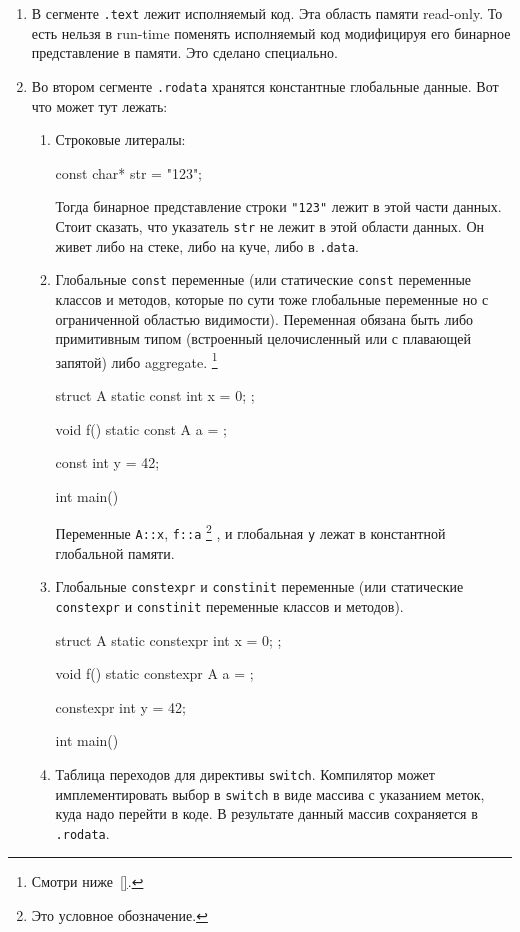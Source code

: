 \documentclass{article}
\begin{document}
\begin{enumerate}
\item В сегменте \verb".text" лежит исполняемый код.
Эта область памяти read-only.
То есть нельзя в run-time поменять исполняемый код модифицируя его бинарное представление в памяти.
Это сделано специально.

\item Во втором сегменте \verb".rodata" хранятся константные глобальные данные.
Вот что может тут лежать:
\begin{enumerate}
\item Строковые литералы:
\begin{cppcode}[numbers = none]
const char* str = "123";
\end{cppcode}
Тогда бинарное представление строки \verb$"123"$ лежит в этой части данных.
Стоит сказать, что указатель \verb"str" не лежит в этой области данных.
Он живет либо на стеке, либо на куче, либо в \verb".data".

\item Глобальные \verb"const" переменные (или статические \verb"const" переменные классов и методов, которые по сути тоже глобальные переменные но с ограниченной областью видимости).
Переменная обязана быть либо примитивным типом (встроенный целочисленный или с плавающей запятой) либо aggregate.%
\footnote{Смотри ниже~\ref{}.}
\begin{cppcode}[numbers = none]
struct A {
  static const int x = 0;
};

void f() {
  static const A a = {};
}

const int y = 42;

int main() {
}
\end{cppcode}
Переменные \verb"A::x", \verb"f::a"%
\footnote{Это условное обозначение.}%
, и глобальная \verb"y" лежат в константной глобальной памяти.

\item  Глобальные \verb"constexpr" и \verb"constinit" переменные (или статические \verb"constexpr" и \verb"constinit" переменные классов и методов).
\begin{cppcode}[numbers = none]
struct A {
  static constexpr int x = 0;
};

void f() {
  static constexpr A a = {};
}

constexpr int y = 42;

int main() {
}
\end{cppcode}

\item Таблица переходов для директивы \verb"switch".
Компилятор может имплементировать выбор в \verb"switch" в виде массива с указанием меток, куда надо перейти в коде.
В результате данный массив сохраняется в \verb".rodata".


\end{enumerate}
\end{enumerate}
\end{document}

